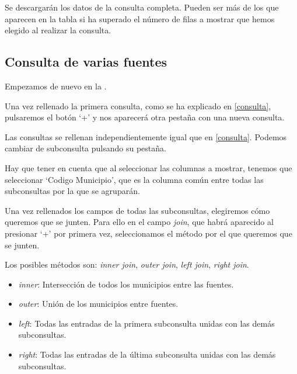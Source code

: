 Se descargarán los datos de la consulta completa. Pueden ser más de los que aparecen en la tabla si ha superado el número de filas a mostrar que hemos elegido al realizar la consulta.


\subsection{Consulta de varias fuentes}

Empezamos de nuevo en la .

Una vez rellenado la primera consulta, como se ha explicado en \ref{consulta}, pulsaremos el botón `+' y nos aparecerá otra pestaña con una nueva consulta.



Las consultas se rellenan independientemente igual que en \ref{consulta}. Podemos cambiar de subconsulta pulsando su pestaña.

Hay que tener en cuenta que al seleccionar las columnas a mostrar, tenemos que seleccionar `Codigo Municipio', que es la columna común entre todas las subconsultas por la que se agruparán.

Una vez rellenados los campos de todas las subconsultas, elegiremos cómo queremos que se junten. Para ello en el campo \textit{join}, que habrá aparecido al presionar `+' por primera vez, seleccionamos el método por el que queremos que se junten.

Los posibles métodos son: \textit{inner join}, \textit{outer join}, \textit{left join}, \textit{right join}.

\begin{itemize}
	\item \textit{inner}: Intersección de todos los municipios entre las fuentes.
	\item \textit{outer}: Unión de los municipios entre fuentes.
	\item \textit{left}: Todas las entradas de la primera subconsulta unidas con las demás subconsultas.
	\item \textit{right}: Todas las entradas de la última subconsulta unidas con las demás subconsultas.
\end{itemize}

